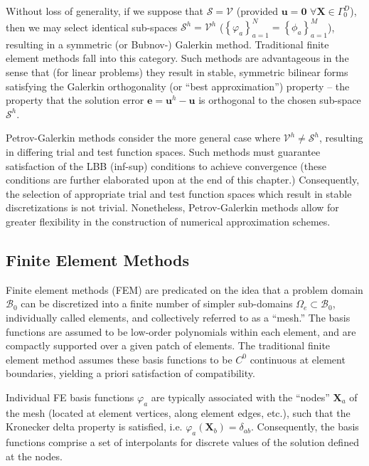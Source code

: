 Without loss of generality, if we suppose that $\mathcal{S} = \mathcal{V}$ (provided $\mathbf{u} = \mathbf{0} \, \, \forall \mathbf{X} \in \Gamma^D_0$), then we may select identical sub-spaces $\mathcal{S}^h = \mathcal{V}^h$ ($\left\{ \varphi_a \right\}_{a = 1}^{N} = \left\{ \phi_a \right\}_{a = 1}^{M}$), resulting in a symmetric (or Bubnov-) Galerkin method. Traditional finite element methods fall into this category. Such methods are advantageous in the sense that (for linear problems) they result in stable, symmetric bilinear forms satisfying the Galerkin orthogonality (or ``best approximation'') property -- the property that the solution error $\mathbf{e} = \mathbf{u}^h - \mathbf{u}$ is orthogonal to the chosen sub-space $\mathcal{S}^h$.

Petrov-Galerkin methods consider the more general case where $\mathcal{V}^h \neq \mathcal{S}^h$, resulting in differing trial and test function spaces. Such methods must guarantee satisfaction of the LBB (inf-sup) conditions to achieve convergence (these conditions are further elaborated upon at the end of this chapter.) Consequently, the selection of appropriate trial and test function spaces which result in stable discretizations is not trivial. Nonetheless, Petrov-Galerkin methods allow for greater flexibility in the construction of numerical approximation schemes.

\subsection*{Finite Element Methods}

Finite element methods (FEM) are predicated on the idea that a problem domain $\mathcal{B}_0$ can be discretized into a finite number of simpler sub-domains $\Omega_e \subset \mathcal{B}_0$, individually called elements, and collectively referred to as a ``mesh.'' The basis functions are assumed to be low-order polynomials within each element, and are compactly supported over a given patch of elements. The traditional finite element method assumes these basis functions to be $C^0$ continuous at element boundaries, yielding a priori satisfaction of compatibility.

Individual FE basis functions $\varphi_a$ are typically associated with the ``nodes'' $\mathbf{X}_a$ of the mesh (located at element vertices, along element edges, etc.), such that the Kronecker delta property is satisfied, i.e. $\varphi_a (\mathbf{X}_b) = \delta_{ab}$. Consequently, the basis functions comprise a set of interpolants for discrete values of the solution defined at the nodes.

